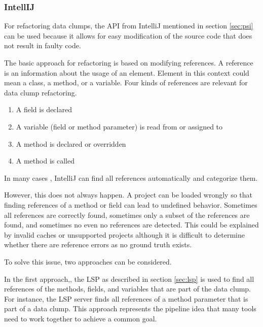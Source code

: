 \subsubsection{IntellIJ} \label{sec:intellij_refactoring}

For refactoring data clumps, the  \ac{API} from IntelliJ mentioned in section \ref{sec:psi} can be used because it allows for easy modification of the source code that does not result in faulty code. 


\begin{comment}The reasons for this are difficult to determine and the documentation is scarce, so the the PSI approach seems to be only suitable for projects created via IntelliJ or correctly initialized by IntelliJ with the required meta data. Gradle and maven projects are therefore not suitable for the full refactoring step. 
\end{comment}


The basic approach for refactoring is based on modifying references. A  reference is an information about the usage of an element. Element in this context could mean a class, a method, or a variable. Four kinds of references are relevant for data clump refactoring.

\begin{enumerate}
     \item A field is declared
    \item A variable (field or method parameter) is read from or assigned to
   
    \item A method is declared or overridden
    \item A method is called
\end{enumerate}
In many cases , IntelliJ can find all references automatically and categorize them.

However, this does not always happen. A project can be loaded wrongly so that  finding references of a method or field can lead to undefined behavior. Sometimes all references are correctly found, sometimes only a subset of the references are found, and sometimes no even no references are detected. This could be explained by invalid caches or unsupported projects although it is difficult to determine whether there are reference errors as no ground truth exists.

To solve this issue, two approaches can be considered.

In the first approach,, the \ac{LSP} as described in section \ref{sec:lsp} is used to find all references of the methods, fields, and variables that are part of the data clump. For instance, the \ac{LSP} server finds all references of a method parameter that is part of a data clump. This approach represents the pipeline idea that many tools need to work together to achieve a common goal.

